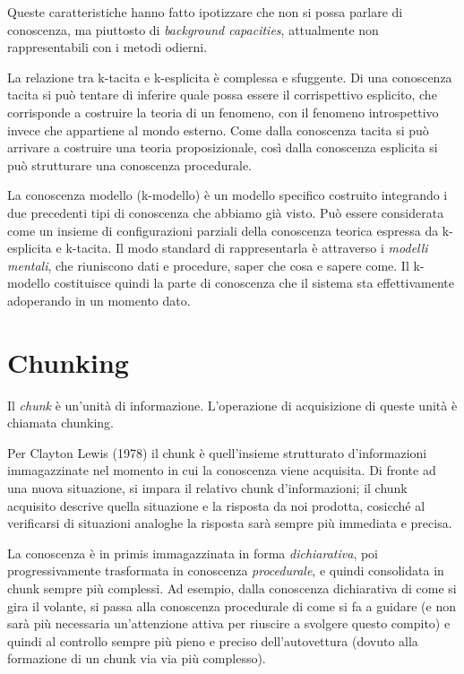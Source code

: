 Queste caratteristiche hanno fatto ipotizzare che non si possa parlare di conoscenza, ma piuttosto di \emph{background capacities}, attualmente non rappresentabili con i metodi odierni.

La relazione tra k-tacita e k-esplicita è complessa e sfuggente. Di una conoscenza tacita si può tentare di inferire quale possa essere il corrispettivo esplicito, che corrisponde a costruire la teoria di un fenomeno, con il fenomeno introspettivo invece che appartiene al mondo esterno. Come dalla conoscenza tacita si può arrivare a costruire una teoria proposizionale, così dalla conoscenza esplicita si può strutturare una conoscenza procedurale.

La conoscenza modello (k-modello) è un modello specifico costruito integrando i due precedenti tipi di conoscenza che abbiamo già visto. Può essere considerata come un insieme di configurazioni parziali della conoscenza teorica espressa da k-esplicita e k-tacita. Il modo standard di rappresentarla è attraverso i \emph{modelli mentali}, che riuniscono dati e procedure, saper che cosa e sapere come. Il k-modello costituisce quindi la parte di conoscenza che il sistema sta effettivamente adoperando in un momento dato.

\section{Chunking}
Il \emph{chunk} è un'unità di informazione. L'operazione di acquisizione di queste unità è chiamata chunking.

 Per Clayton Lewis (1978) il chunk è quell'insieme strutturato d'informazioni immagazzinate nel momento in cui la conoscenza viene acquisita. Di fronte ad una nuova situazione, si impara il relativo chunk d'informazioni; il chunk acquisito descrive quella situazione e la risposta da noi prodotta, cosicché al verificarsi di situazioni analoghe la risposta sarà sempre più immediata e precisa.

La conoscenza è in primis immagazzinata in forma \emph{dichiarativa}, poi progressivamente trasformata in conoscenza \emph{procedurale}, e quindi consolidata in chunk sempre più complessi. Ad esempio, dalla conoscenza dichiarativa di come si gira il volante, si passa alla conoscenza procedurale di come si fa a guidare (e non sarà più necessaria un'attenzione attiva per riuscire a svolgere questo compito) e quindi al controllo sempre più pieno e preciso dell'autovettura (dovuto alla formazione di un chunk via via più complesso).

